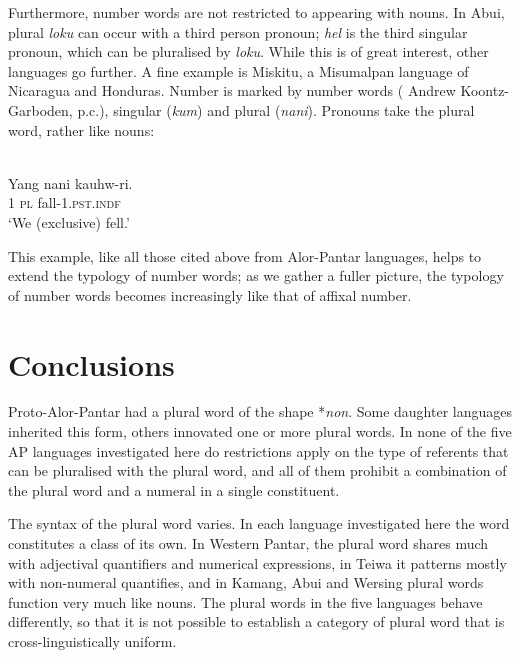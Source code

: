  Furthermore, number words are not restricted to appearing with nouns. In Abui, plural \textit{loku} can occur with a third person pronoun; \textit{hel} is the third singular pronoun, which can be pluralised by \textit{loku}. While this is of great interest, other languages go further. A fine example is Miskitu, a Misumalpan language of Nicaragua and Honduras. Number is marked by number words (\citealt{Greenms} Andrew Koontz-Garboden, p.c.), singular (\textit{kum}) and plural (\textit{nani}). Pronouns take the plural word, rather like nouns:


\ea%
\label{ex:9:113}
 \\
\gll   Yang nani {kauhw-ri.}\\
  1 \textsc{pl} fall-1.\textsc{pst.indf}  \\
\glt `We (exclusive) fell.'
\z






This example, like all those cited above from Alor-Pantar languages, helps to extend the typology of number words; as we gather a fuller picture, the typology of number words becomes increasingly like that of affixal number.


\section{Conclusions} %
\label{sec:9:6}
Proto-Alor-Pantar had a plural word of the shape *\textit{non}. Some daughter languages inherited this form, others innovated one or more plural words. In none of the five AP languages investigated here do restrictions apply on the type of referents that can be pluralised with the plural word, and all of them prohibit a combination of the plural word and a numeral in a single constituent.

 The syntax of the plural word varies. In each language investigated here the word constitutes a class of its own. In Western Pantar, the plural word shares much with adjectival quantifiers and numerical expressions, in Teiwa it patterns mostly with non-numeral quantifies, and in Kamang, Abui and Wersing plural words function very much like nouns. The plural words in the five languages behave differently, so that it is not possible to establish a category of plural word that is cross-linguistically uniform.

